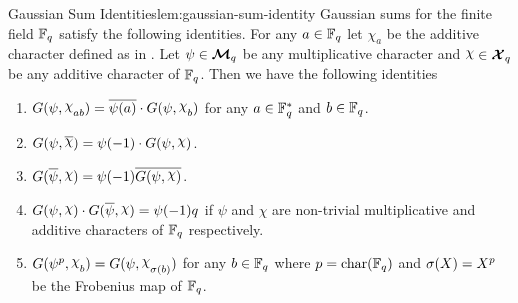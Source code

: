 \begin{lemma}{Gaussian Sum Identities}{lem:gaussian-sum-identity}
  Gaussian sums for the finite field $\mathbb{F}_q$ satisfy the following identities. For any $a\in \mathbb{F}_q$ let $\chi_a$ be the additive character defined as in . Let $\psi\in\boldsymbol{\mathcal{M}}_q$ be any multiplicative character and $\chi\in\Xq$ be any additive character of $\mathbb{F}_q$.  Then we have the following identities\begin{enumerate}[label=(\roman*)]
    \item $G(\psi,\chi_{ab})=\ov{\psi(a)}\cdot G(\psi,\chi_b)$ for any $a\in \mathbb{F}_q^*$ and $b\in \mathbb{F}_q$.
    \item $G(\psi,\ov{\chi})=\psi(-1)\cdot G(\psi,\chi)$.
    \item $G(\ov{\psi},\chi)=\psi(-1)\ov{G(\psi,\chi)}$.
    \item $G(\psi,\chi)\cdot G(\ov{\psi},\chi)=\psi(-1)q$ if $\psi$ and $\chi$ are non-trivial multiplicative and additive characters of $\mathbb{F}_q$ respectively.
    \item $G(\psi^p,\chi_b)=G(\psi,\chi_{\sg(b)} )$ for any $b\in \mathbb{F}_q$ where $p=\operatorname{char}(\mathbb{F}_q)$ and $\sigma(X)=X^p$ be the Frobenius map of $\mathbb{F}_q$.
  \end{enumerate}
\end{lemma}

